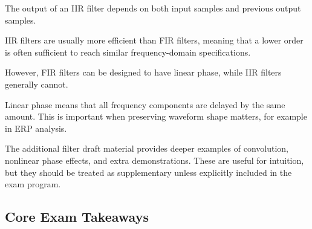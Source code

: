 The output of an IIR filter depends on both input samples and previous output samples.

IIR filters are usually more efficient than FIR filters, meaning that a lower order is often sufficient to reach similar frequency-domain specifications.

However, FIR filters can be designed to have linear phase, while IIR filters generally cannot.

\begin{authornote}
Linear phase means that all frequency components are delayed by the same amount. This is important when preserving waveform shape matters, for example in ERP analysis.
\end{authornote}

\begin{noexam}
The additional filter draft material provides deeper examples of convolution, nonlinear phase effects, and extra demonstrations. These are useful for intuition, but they should be treated as supplementary unless explicitly included in the exam program.
\end{noexam}

\subsection{Core Exam Takeaways}

